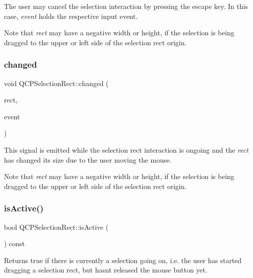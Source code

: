 The user may cancel the selection interaction by pressing the escape key. In this case, {\itshape event} holds the respective input event.

Note that {\itshape rect} may have a negative width or height, if the selection is being dragged to the upper or left side of the selection rect origin. \mbox{\label{class_q_c_p_selection_rect_a1bab11026bca52740c2e6682623e6964}} 
\subsubsection{\texorpdfstring{changed}{changed}}
{\footnotesize\ttfamily void Q\+C\+P\+Selection\+Rect\+::changed (\begin{DoxyParamCaption}\item[{const Q\+Rect \&}]{rect,  }\item[{Q\+Mouse\+Event $\ast$}]{event }\end{DoxyParamCaption})\hspace{0.3cm}{\ttfamily [signal]}}

This signal is emitted while the selection rect interaction is ongoing and the {\itshape rect} has changed its size due to the user moving the mouse.

Note that {\itshape rect} may have a negative width or height, if the selection is being dragged to the upper or left side of the selection rect origin. \mbox{\label{class_q_c_p_selection_rect_ad27c1569c6ea8fa48e24b81e2a302df3}} 
\subsubsection{\texorpdfstring{is\+Active()}{isActive()}}
{\footnotesize\ttfamily bool Q\+C\+P\+Selection\+Rect\+::is\+Active (\begin{DoxyParamCaption}{ }\end{DoxyParamCaption}) const\hspace{0.3cm}{\ttfamily [inline]}}

Returns true if there is currently a selection going on, i.\+e. the user has started dragging a selection rect, but hasn\textquotesingle{}t released the mouse button yet.

